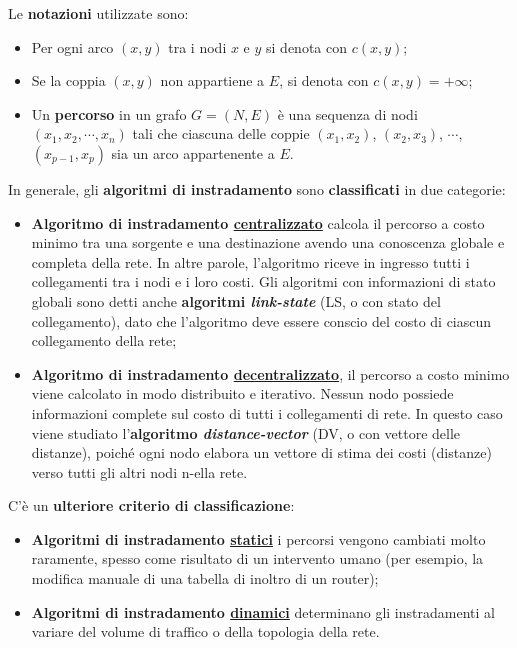 \documentclass[a4paper]{article}
\begin{document}
	\noindent
	Le \textbf{notazioni} utilizzate sono:
	\begin{itemize}
		\item Per ogni arco $\left(x,y\right)$ tra i nodi $x$ e $y$ si denota con $c\left(x,y\right)$;
		\item Se la coppia $\left(x,y\right)$ non appartiene a $E$, si denota con $c\left(x,y\right) = +\infty$;
		\item Un \textbf{percorso} in un grafo $G=\left(N,E\right)$ è una sequenza di nodi $\left(x_{1},x_{2},\cdots,x_{n}\right)$ tali che ciascuna delle coppie $\left(x_{1},x_{2}\right)$, $\left(x_{2},x_{3}\right)$, $\cdots$, $\left(x_{p-1},x_{p}\right)$ sia un arco appartenente a $E$.
	\end{itemize}
	
	\noindent
	In generale, gli \textbf{algoritmi di instradamento} sono \textbf{classificati} in due categorie:
	\begin{itemize}
		\item \textbf{Algoritmo di instradamento \underline{centralizzato}} calcola il percorso a costo minimo tra una sorgente e una destinazione avendo una conoscenza globale e completa della rete.\newline
		In altre parole, l’algoritmo riceve in ingresso tutti i collegamenti tra i nodi e i loro costi. Gli algoritmi con informazioni di stato globali sono detti anche \textbf{algoritmi \emph{link-state}} (LS, o con stato del collegamento), dato che l’algoritmo deve essere conscio del costo di ciascun collegamento della rete;
		
		\item \textbf{Algoritmo di instradamento \underline{decentralizzato}}, il percorso a costo minimo viene calcolato in modo distribuito e iterativo. Nessun nodo possiede informazioni complete sul costo di tutti i collegamenti di rete. In questo caso viene studiato l’\textbf{algoritmo \emph{distance-vector}} (DV, o con vettore delle distanze), poiché ogni nodo elabora un vettore di stima dei costi (distanze) verso tutti gli altri nodi n-ella rete.
	\end{itemize}
	
	\noindent
	C’è un \textbf{ulteriore criterio di classificazione}:
	\begin{itemize}
		\item \textbf{Algoritmi di instradamento \underline{statici}} i percorsi vengono cambiati molto raramente, spesso come risultato di un intervento umano (per esempio, la modifica manuale di una tabella di inoltro di un router);
		
		\item \textbf{Algoritmi di instradamento \underline{dinamici}} determinano gli instradamenti al variare del volume di traffico o della topologia della rete.
	\end{itemize}
	
\end{document}
